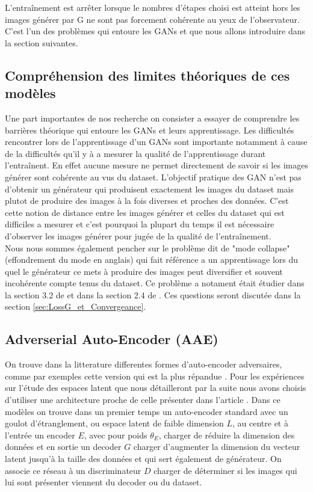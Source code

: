 \documentclass[11pt,francais]{article}
\begin{document}
L'entraînement est arrêter lorsque le nombres d'étapes choisi est atteint hors les images générer par G ne sont pas forcement cohérente au yeux de l'observateur. C'est l'un des problèmes qui entoure les GANs et que nous allons introduire dans la section suivantes.

\subsection{Compréhension des limites théoriques de ces modèles}
\label{sec:CompEtLimites}
Une part importantes de nos recherche on consister a essayer de comprendre les barrières théorique qui entoure les GANs et leurs apprentissage.
Les difficultés rencontrer lors de l'apprentissage d'un GANs sont importante notamment à cause de la difficultés qu'il y à a mesurer la qualité de l'apprentissage durant l'entraînent. En effet aucune mesure ne permet directement de savoir si les images générer sont cohérente au vus du dataset. L'objectif pratique des GAN n'est pas d'obtenir un générateur qui produisent exactement les images du dataset mais plutot de produire des images à la fois diverses et proches des données. C'est cette notion de distance entre les images générer et celles du dataset qui est difficiles a mesurer et c'est pourquoi la plupart du temps il est nécessaire d'observer les images générer pour jugée de la qualité de l'entraînement.\\
Nous nous sommes également pencher sur le problème dit de "mode collapse" (effondrement du mode en anglais) qui fait référence a un apprentissage lors du quel le générateur ce mets à produire des images peut diversifier et souvent incohérente compte tenus du dataset. Ce problème a notament était étudier dans la section 3.2 de \cite{salimans2016improved} et dans la section 2.4 de \cite{DBLP:journals/corr/MetzPPS16}.
Ces questions seront discutée dans la section \ref{sec:LossG_et_Convergeance}.

\subsection{Adverserial Auto-Encoder (AAE)}
\label{sec:AAE}
On trouve dans la litterature differentes formes d'auto-encoder adversaires, comme par exemples cette version qui est la plus répandue \cite{makhzani2015adversarial}.
Pour les expériences sur l'étude des espaces latent que nous détailleront par la suite nous avons choisis d'utiliser une architecture proche de celle présenter dans l'article \cite{GADAE}.
Dans ce modèles on trouve dans un premier temps un auto-encoder standard avec un goulot d'étranglement, ou espace latent de faible dimension \(L\), au centre et à l'entrée un encoder \(E\), avec pour poids \(\theta_E\), charger de réduire la dimension des données et en sortie un decoder \(G\) charger d'augmenter la dimension du vecteur latent jusqu'à la taille des données et qui sert également de générateur. On associe ce réseau à un discriminateur \(D\) charger de déterminer si les images qui lui sont présenter viennent du decoder ou du dataset.
\end{document}
